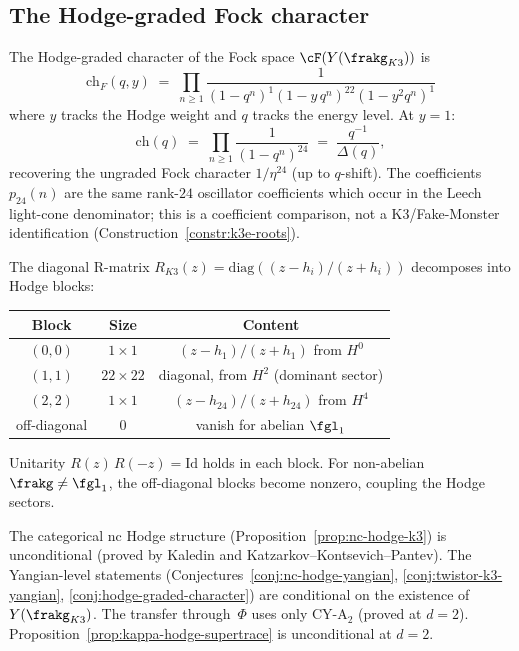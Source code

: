 \subsection{The Hodge-graded Fock character}
\label{subsec:nc-hodge-character}

\begin{conjecture}
\label{conj:hodge-graded-character}
\ClaimStatusConjectured
The Hodge-graded character of the Fock space
$\cF(Y(\frakg_{K3}))$ is
\[
 \mathrm{ch}_F(q, y)
 \;=\; \prod_{n \geq 1}
 \frac{1}{(1 - q^n)^1 (1 - y\, q^n)^{22} (1 - y^2 q^n)^1}
\]
where $y$ tracks the Hodge weight and $q$ tracks the energy level.
At $y = 1$:
\[
 \mathrm{ch}(q)
 \;=\; \prod_{n \geq 1} \frac{1}{(1-q^n)^{24}}
 \;=\; \frac{q^{-1}}{\Delta(q)},
\]
recovering the ungraded Fock character $1/\eta^{24}$ (up to
$q$-shift). The coefficients $p_{24}(n)$ are the same rank-$24$
oscillator coefficients which occur in the Leech light-cone
denominator; this is a coefficient comparison, not a K3/Fake-Monster
identification
(Construction~\ref{constr:k3e-roots}).
\end{conjecture}

\begin{remark}
\label{rem:hodge-r-matrix}
The diagonal R-matrix
$R_{K3}(z) = \mathrm{diag}((z-h_i)/(z+h_i))$
decomposes into Hodge blocks:
\begin{center}
\begin{tabular}{ccc}
\toprule
Block & Size & Content \\
\midrule
$(0,0)$ & $1 \times 1$ & $(z - h_1)/(z + h_1)$ from $H^0$ \\
$(1,1)$ & $22 \times 22$ & diagonal, from $H^2$ (dominant sector) \\
$(2,2)$ & $1 \times 1$ & $(z - h_{24})/(z + h_{24})$ from $H^4$ \\
off-diagonal & $0$ & vanish for abelian $\fgl_1$ \\
\bottomrule
\end{tabular}
\end{center}
\noindent Unitarity $R(z)\, R(-z) = \mathrm{Id}$ holds in each
block. For non-abelian $\frakg \neq \fgl_1$, the off-diagonal
blocks become nonzero, coupling the Hodge sectors.
\end{remark}

\begin{remark}
\label{rem:nc-hodge-dependency}
The categorical nc Hodge structure
(Proposition~\ref{prop:nc-hodge-k3}) is unconditional (proved by
Kaledin and Katzarkov--Kontsevich--Pantev). The Yangian-level
statements (Conjectures~\ref{conj:nc-hodge-yangian},
\ref{conj:twistor-k3-yangian},
\ref{conj:hodge-graded-character}) are conditional on
the existence of $Y(\frakg_{K3})$. The transfer
through~$\Phi$ uses only CY-A$_2$ (proved at $d = 2$).
Proposition~\ref{prop:kappa-hodge-supertrace} is unconditional
at $d = 2$.
\end{remark}


